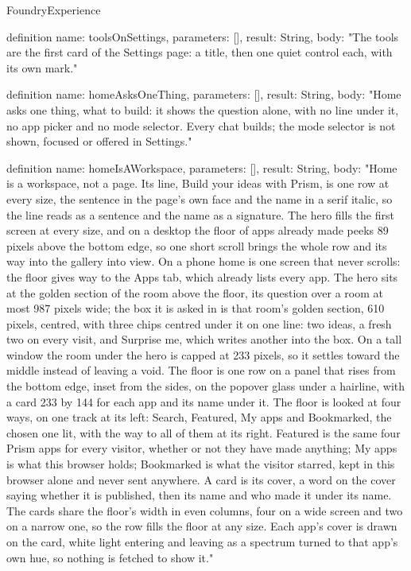 \begin{lexlean}{FoundryExperience}
\begin{semanticmodule}
definition{
  name: toolsOnSettings,
  parameters: [],
  result: String,
  body: "The tools are the first card of the Settings page: a title, then one quiet control each, with its own mark."
}

definition{
  name: homeAsksOneThing,
  parameters: [],
  result: String,
  body: "Home asks one thing, what to build: it shows the question alone, with no line under it, no app picker and no mode selector. Every chat builds; the mode selector is not shown, focused or offered in Settings."
}

definition{
  name: homeIsAWorkspace,
  parameters: [],
  result: String,
  body: "Home is a workspace, not a page. Its line, Build your ideas with Prism, is one row at every size, the sentence in the page's own face and the name in a serif italic, so the line reads as a sentence and the name as a signature. The hero fills the first screen at every size, and on a desktop the floor of apps already made peeks 89 pixels above the bottom edge, so one short scroll brings the whole row and its way into the gallery into view. On a phone home is one screen that never scrolls: the floor gives way to the Apps tab, which already lists every app. The hero sits at the golden section of the room above the floor, its question over a room at most 987 pixels wide; the box it is asked in is that room's golden section, 610 pixels, centred, with three chips centred under it on one line: two ideas, a fresh two on every visit, and Surprise me, which writes another into the box. On a tall window the room under the hero is capped at 233 pixels, so it settles toward the middle instead of leaving a void. The floor is one row on a panel that rises from the bottom edge, inset from the sides, on the popover glass under a hairline, with a card 233 by 144 for each app and its name under it. The floor is looked at four ways, on one track at its left: Search, Featured, My apps and Bookmarked, the chosen one lit, with the way to all of them at its right. Featured is the same four Prism apps for every visitor, whether or not they have made anything; My apps is what this browser holds; Bookmarked is what the visitor starred, kept in this browser alone and never sent anywhere. A card is its cover, a word on the cover saying whether it is published, then its name and who made it under its name. The cards share the floor's width in even columns, four on a wide screen and two on a narrow one, so the row fills the floor at any size. Each app's cover is drawn on the card, white light entering and leaving as a spectrum turned to that app's own hue, so nothing is fetched to show it."
}


\end{semanticmodule}
\end{lexlean}
